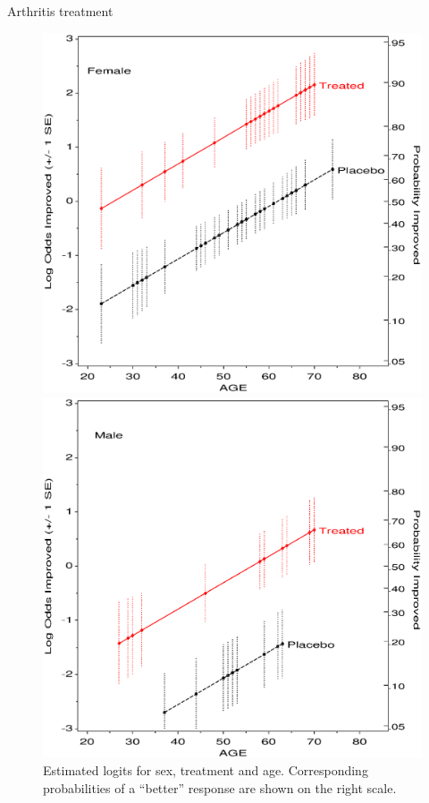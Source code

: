 \begin{Example}[arthrit10]{Arthritis treatment}
\begin{figure}[htb]
 \begin{minipage}[t]{.49\linewidth}
  \includegraphics[width=1\linewidth]{ch6/fig/glogist1b1}
 \end{minipage}%
 \hfill
 \begin{minipage}[t]{.49\linewidth}
  \includegraphics[width=1\linewidth]{ch6/fig/glogist1b2}
 \end{minipage}
 \caption[Estimated logits for sex, treatment and age]{Estimated logits for sex, treatment and age.
 Corresponding probabilities of a ``better'' response are shown on the right scale.}\label{fig:glogist1b}
\end{figure}


\end{Example}
